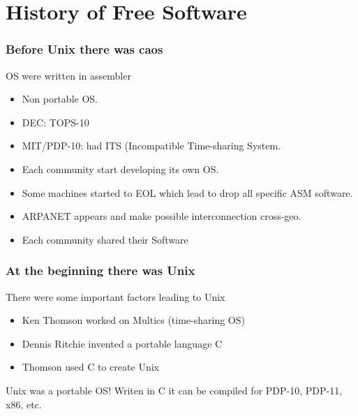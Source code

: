 \documentclass[hyperref={pdfpagelabels=false},xcolor=pst,pdf,fragile]{beamer}
\begin{document}
\section{History of Free Software}

\begin{frame}
  \frametitle{Before Unix there was caos}

  \begin{block}{OS were written in assembler}
	  \begin{itemize}
		  \item Non portable OS.
		  \item DEC: TOPS-10
		  \item MIT/PDP-10: had ITS (Incompatible Time-sharing System.
	  \end{itemize}
  \end{block}

  \pause
  \begin{itemize}
	  \item Each community start developing its own OS.
	  \item Some machines started to EOL which lead to drop all specific
		  ASM software.
	  \item ARPANET appears and make possible interconnection cross-geo.
	  \item \alert{Each community shared their Software}
  \end{itemize}

\end{frame}

\begin{frame}
  \frametitle{At the beginning there was Unix}

  There were some important factors leading to Unix

  \begin{itemize}
	  \item Ken Thomson worked on Multics (time-sharing OS)
	  \item Dennis Ritchie invented a portable language C
	  \item Thomson used C to create Unix
  \end{itemize}

  \pause

  \begin{alertblock}{Unix was a portable OS!}
	  Writen in C it can be compiled for PDP-10, PDP-11, x86, etc.
  \end{alertblock}

\end{frame}
\end{document}
